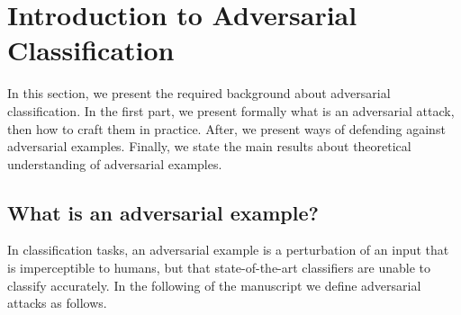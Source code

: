 \section{Introduction to Adversarial Classification}

In this section, we present the required background about adversarial classification. In the first part, we present formally what is an adversarial attack, then how to craft them in practice. After, we present ways of defending against adversarial examples. Finally, we state the main results about theoretical understanding of adversarial examples. 
\subsection{What is an adversarial example?}

In classification tasks, an adversarial example is a perturbation of an input that is imperceptible to humans, but that state-of-the-art classifiers are unable to  classify accurately. In the following of the manuscript we define adversarial attacks as follows.


